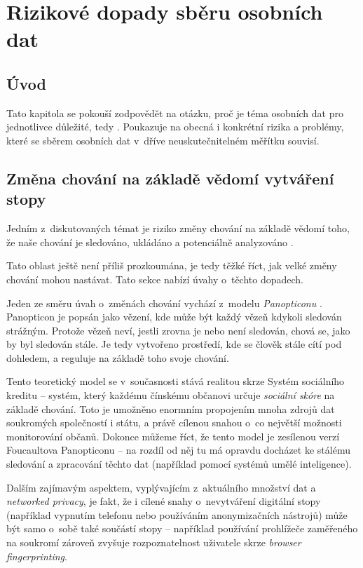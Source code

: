 \chapter{Rizikové dopady sběru osobních dat}

\section*{Úvod}
Tato kapitola se pokouší zodpovědět na otázku, proč je téma osobních dat pro jednotlivce důležité, tedy . Poukazuje na obecná i konkrétní rizika a problémy, které se sběrem osobních dat v~dříve neuskutečnitelném měřítku souvisí. 


\section{Změna chování na základě vědomí vytváření stopy}

Jedním z~diskutovaných témat je riziko změny chování na základě vědomí toho, že naše chování je sledováno, ukládáno a potenciálně analyzováno \citep{behavior-changes}.

Tato oblast ještě není příliš prozkoumána, je tedy těžké říct, jak velké změny chování mohou nastávat. Tato sekce nabízí úvahy o~těchto dopadech.

Jeden ze směru úvah o~změnách chování vychází z~modelu \textit{Panopticonu} \citep{panopticon}. Panopticon je popsán jako vězení, kde může být každý vězeň kdykoli sledován strážným. Protože vězeň neví, jestli zrovna je nebo není sledován, chová se, jako by byl sledován stále. Je tedy vytvořeno prostředí, kde se člověk stále cítí pod dohledem, a reguluje na základě toho svoje chování.

Tento teoretický model se v~současnosti stává realitou skrze Systém sociálního kreditu -- systém, který každému čínskému občanovi určuje \textit{sociální skóre} na základě chování. Toto je umožněno enormním propojením mnoha zdrojů dat soukromých společností i státu, a právě cílenou snahou o~co největší možnosti monitorování občanů. Dokonce můžeme říct, že tento model je zesílenou verzí Foucaultova Panopticonu -- na rozdíl od něj tu má opravdu docházet ke stálému sledování a zpracování těchto dat (například pomocí systémů umělé inteligence).

Dalším zajímavým aspektem, vyplývajícím z~aktuálního množství dat a \textit{networked privacy}, je fakt, že i cílené snahy o~nevytváření digitální stopy (například vypnutím telefonu nebo používáním anonymizačních nástrojů) může být samo o~sobě také součástí stopy -- například používání prohlížeče zaměřeného na soukromí zároveň zvyšuje rozpoznatelnost uživatele skrze \textit{browser fingerprinting}.

